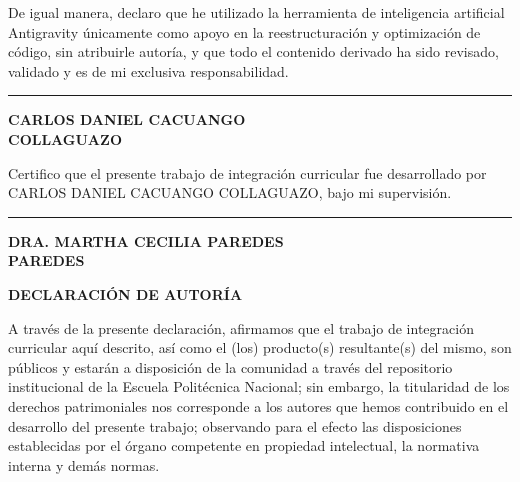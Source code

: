 \vspace{0.5cm}
\noindent De igual manera, declaro que he utilizado la herramienta de inteligencia artificial Antigravity únicamente como apoyo en la reestructuración y optimización de código, sin atribuirle autoría, y que todo el contenido derivado ha sido revisado, validado y es de mi exclusiva responsabilidad.

\vspace{2.5cm}
\begin{center}
    \begin{minipage}{7cm}
        \centering
        \hrule
        \vspace{0.2cm}
        \textbf{CARLOS DANIEL CACUANGO}\\
        \textbf{COLLAGUAZO}
    \end{minipage}
\end{center}

\vspace{2.0cm}
\noindent Certifico que el presente trabajo de integración curricular fue desarrollado por CARLOS DANIEL CACUANGO COLLAGUAZO, bajo mi supervisión.

\vspace{2.5cm}
\begin{flushright}
    \begin{minipage}{7cm}
        \centering
        \hrule
        \vspace{0.2cm}
        \textbf{DRA. MARTHA CECILIA PAREDES}\\
        \textbf{PAREDES}
    \end{minipage}
\end{flushright}

\clearpage

\begin{center}
    {\fontsize{14}{17}\bfseries\sffamily DECLARACIÓN DE AUTORÍA}
\end{center}
\vspace{1.0cm}

\noindent A través de la presente declaración, afirmamos que el trabajo de integración curricular aquí descrito, así como el (los) producto(s) resultante(s) del mismo, son públicos y estarán a disposición de la comunidad a través del repositorio institucional de la Escuela Politécnica Nacional; sin embargo, la titularidad de los derechos patrimoniales nos corresponde a los autores que hemos contribuido en el desarrollo del presente trabajo; observando para el efecto las disposiciones establecidas por el órgano competente en propiedad intelectual, la normativa interna y demás normas.

